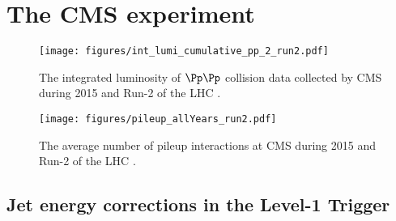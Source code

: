 \section{The CMS experiment}

\begin{figure}[htbp]
\centering
\texttt{[image: figures/int\_lumi\_cumulative\_pp\_2\_run2.pdf]}
\caption[The integrated luminosity of $\Pp\Pp$ collision data collected by CMS during 2015 and Run-2 of the LHC]{The integrated luminosity of $\Pp\Pp$ collision data collected by CMS during 2015 and Run-2 of the LHC \cite{cmslumitwikipage}.}
\end{figure}

\begin{figure}[htbp]
\centering
\texttt{[image: figures/pileup\_allYears\_run2.pdf]}
\caption[The average number of pileup interactions at CMS during 2015 and Run-2 of the LHC]{The average number of pileup interactions at CMS during 2015 and Run-2 of the LHC \cite{cmslumitwikipage}.}
\end{figure}

\subsection{Jet energy corrections in the Level-1 Trigger}
